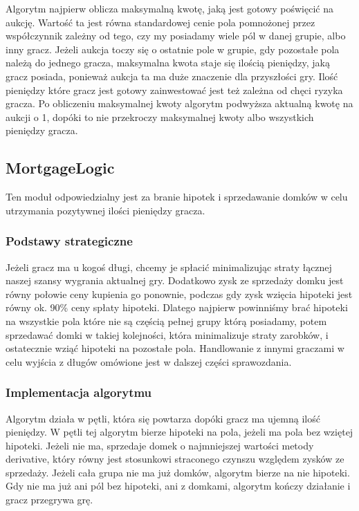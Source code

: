 \documentclass{article}
\begin{document}
Algorytm najpierw oblicza maksymalną kwotę, jaką jest gotowy poświęcić na aukcję. Wartość ta jest równa standardowej cenie pola pomnożonej przez współczynnik zależny od tego, czy my posiadamy wiele pól w danej grupie, albo inny gracz. Jeżeli aukcja toczy się o ostatnie pole w grupie, gdy pozostałe pola należą do jednego gracza, maksymalna kwota staje się ilością pieniędzy, jaką gracz posiada, ponieważ aukcja ta ma duże znaczenie dla przyszłości gry. Ilość pieniędzy które gracz jest gotowy zainwestować jest też zależna od chęci ryzyka gracza. Po obliczeniu maksymalnej kwoty algorytm podwyższa aktualną kwotę na aukcji o 1, dopóki to nie przekroczy maksymalnej kwoty albo wszystkich pieniędzy gracza.

\subsection{MortgageLogic}

Ten moduł odpowiedzialny jest za branie hipotek i sprzedawanie domków w celu utrzymania pozytywnej ilości pieniędzy gracza.

\subsubsection{Podstawy strategiczne}

Jeżeli gracz ma u kogoś długi, chcemy je spłacić minimalizując straty łącznej naszej szansy wygrania aktualnej gry. Dodatkowo zysk ze sprzedaży domku jest równy połowie ceny kupienia go ponownie, podczas gdy zysk wzięcia hipoteki jest równy ok. 90\% ceny spłaty hipoteki. Dlatego najpierw powinniśmy brać hipoteki na wszystkie pola które nie są częścią pełnej grupy którą posiadamy, potem sprzedawać domki w takiej kolejności, która minimalizuje straty zarobków, i ostatecznie wziąć hipoteki na pozostałe pola. Handlowanie z innymi graczami w celu wyjścia z długów omówione jest w dalszej części sprawozdania.

\subsubsection{Implementacja algorytmu}

Algorytm działa w pętli, która się powtarza dopóki gracz ma ujemną ilość pieniędzy. W pętli tej algorytm bierze hipoteki na pola, jeżeli ma pola bez wziętej hipoteki. Jeżeli nie ma, sprzedaje domek o najmniejszej wartości metody derivative, który równy jest stosunkowi straconego czynszu względem zysków ze sprzedaży. Jeżeli cała grupa nie ma już domków, algorytm bierze na nie hipoteki. Gdy nie ma już ani pól bez hipoteki, ani z domkami, algorytm kończy działanie i gracz przegrywa grę.
\end{document}
